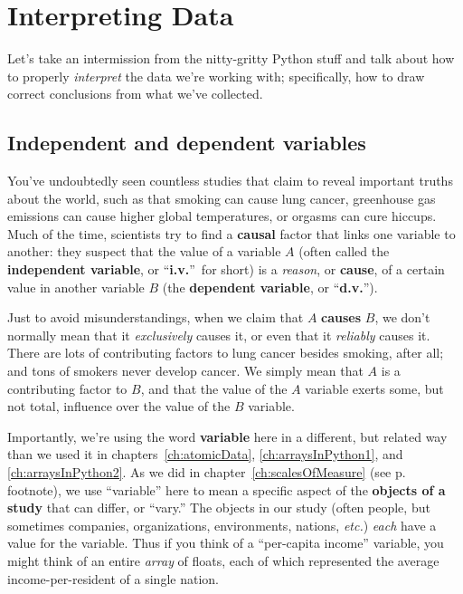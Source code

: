 
\chapter{Interpreting Data}

Let's take an intermission from the nitty-gritty Python stuff and talk about
how to properly \textit{interpret} the data we're working with; specifically,
how to draw correct conclusions from what we've collected.

\section{Independent and dependent variables}


You've undoubtedly seen countless studies that claim to reveal important truths
about the world, such as that smoking can cause lung cancer, greenhouse gas
emissions can cause higher global temperatures, or orgasms can cure hiccups.
Much of the time, scientists try to find a \textbf{causal} factor that links
one variable to another: they suspect that the value of a variable $A$ (often
called the \textbf{independent variable}, or ``\textbf{i.v.}''~for short) is a
\textit{reason}, or \textbf{cause}, of a certain value in another variable $B$
(the \textbf{dependent variable}, or ``\textbf{d.v.}'').

Just to avoid misunderstandings, when we claim that $A$ \textbf{causes} $B$, we
don't normally mean that it \textit{exclusively} causes it, or even that it
\textit{reliably} causes it. There are lots of contributing factors to lung
cancer besides smoking, after all; and tons of smokers never develop cancer. We
simply mean that $A$ is a contributing factor to $B$, and that the value of the
$A$ variable exerts some, but not total, influence over the value of the $B$
variable.


Importantly, we're using the word \textbf{variable} here in a different, but
related way than we used it in chapters~\ref{ch:atomicData},
\ref{ch:arraysInPython1}, and \ref{ch:arraysInPython2}. As we did in
chapter~\ref{ch:scalesOfMeasure} (see p.~\pageref{variableDifferent} footnote),
we use ``variable'' here to mean a specific aspect of the \textbf{objects of a
study} that can differ, or ``vary.'' The objects in our study (often people,
but sometimes companies, organizations, environments, nations, \textit{etc.})
\textit{each} have a value for the variable. Thus if you think of a
``per-capita income'' variable, you might think of an entire \textit{array} of
floats, each of which represented the average income-per-resident of a single
nation.

